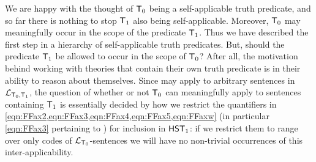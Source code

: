 \documentclass[UKenglish,cleveref,DIV=12]{scrartcl}
\theoremstyle{definition}
\theoremstyle{definition}
\begin{document}

We are happy with the thought of $\mathsf{T}_0$ being a self-applicable truth predicate,
and so far there is nothing to stop $\mathsf{T}_1$ also being self-applicable. Moreover, $\mathsf{T}_0$
may meaningfully occur in the scope of the predicate $\mathsf{T}_1$. Thus we have described the
first step in a hierarchy of self-applicable truth predicates. But, should the
predicate $\mathsf{T}_1$ be allowed to occur in the scope of $\mathsf{T}_0$? After all, the
motivation behind working with theories that contain their own truth predicate
is in their ability to reason about themselves.
Since
 may apply to arbitrary sentences in $\mathcal{L}_{\mathsf{T}_0,\mathsf{T}_1}$, the question
of whether or not $\mathsf{T}_0$ can meaningfully apply to sentences containing $\mathsf{T}_1$
is essentially decided by how we restrict the quantifiers in
\eqref{eqn:FFax2,eqn:FFax3,eqn:FFax4,eqn:FFax5,eqn:FFaxw} (in
particular \eqref{eqn:FFax3} pertaining to ) for inclusion in
$\mathsf{HST}_1$: if we restrict them to range over only codes of $\mathcal{L}_{\mathsf{T}_0}$-sentences we
will have no non-trivial occurrences of this inter-applicability.
\end{document}
